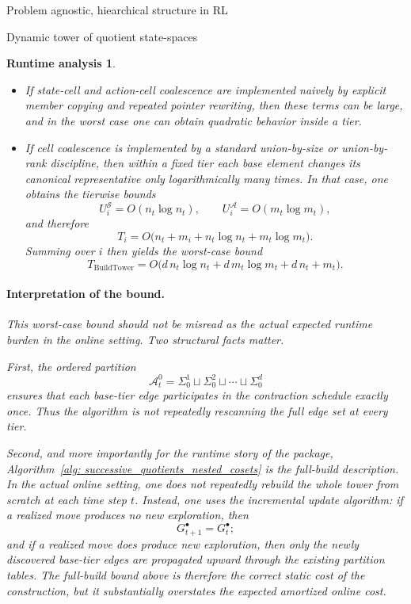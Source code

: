\documentclass[11pt]{article}
\newtheorem{run_analysis}[subsubsection]{Runtime analysis}
\begin{document}
\begin{section}{Problem agnostic, hiearchical structure in RL}
\begin{subsection}{Dynamic tower of quotient state-spaces}
\begin{run_analysis}
\begin{itemize}
    \item If state-cell and action-cell coalescence are implemented naively by explicit member copying and repeated pointer rewriting, then these terms can be large, and in the worst case one can obtain quadratic behavior inside a tier.

    \item If cell coalescence is implemented by a standard union-by-size or union-by-rank discipline, then within a fixed tier each base element changes its canonical representative only logarithmically many times. In that case, one obtains the tierwise bounds
    \[
    U_i^{\mathcal S}=O(n_t\log n_t),
    \qquad
    U_i^{\mathcal A}=O(m_t\log m_t),
    \]
    and therefore
    \[
    T_i
    =
    O\bigl(n_t + m_i + n_t\log n_t + m_t\log m_t\bigr).
    \]
    Summing over $i$ then yields the worst-case bound
    \[
    T_{\mathrm{BuildTower}}
    =
    O\bigl(
    d\,n_t\log n_t + d\,m_t\log m_t + d\,n_t + m_t
    \bigr).
    \]
\end{itemize}

\paragraph{Interpretation of the bound.}
This worst-case bound should not be misread as the actual expected runtime burden in the online setting. Two structural facts matter.

First, the ordered partition
\[
\mathcal{A}_t^0
=
\Sigma_0^1 \sqcup \Sigma_0^2 \sqcup \cdots \sqcup \Sigma_0^d
\]
ensures that each base-tier edge participates in the contraction schedule exactly once. Thus the algorithm is not repeatedly rescanning the full edge set at every tier.

Second, and more importantly for the runtime story of the package, Algorithm~\ref{alg: successive_quotients_nested_cosets} is the \emph{full-build} description. In the actual online setting, one does not repeatedly rebuild the whole tower from scratch at each time step $t$. Instead, one uses the incremental update algorithm: if a realized move produces no new exploration, then
\[
G_{t+1}^\bullet = G_t^\bullet;
\]
and if a realized move does produce new exploration, then only the newly discovered base-tier edges are propagated upward through the existing partition tables. The full-build bound above is therefore the correct static cost of the construction, but it substantially overstates the expected amortized online cost.


\end{run_analysis}
\end{subsection}
\end{section}
\end{document}
